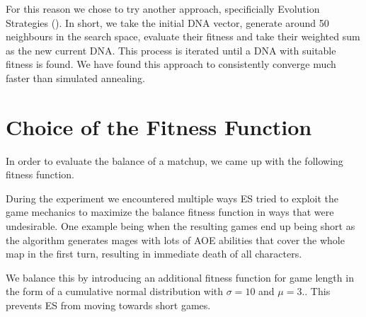 For this reason we chose to try another approach, specificially Evolution
Strategies (). In short, we take the initial DNA vector,
generate around 50 neighbours in the search space, evaluate their fitness
and take their weighted sum as the new current DNA. This process is iterated
until a DNA with suitable fitness is found. We have found this approach to
consistently converge much faster than simulated annealing.

\section{Choice of the Fitness Function}

In order to evaluate the balance of a matchup, we came up with the following fitness function.


During the experiment we encountered multiple ways ES tried to exploit the game
mechanics to maximize the balance fitness function in ways that were
undesirable. One example being when the resulting games end up being short as
the algorithm generates mages with lots of AOE abilities that cover the whole
map in the first turn, resulting in immediate death of all characters.

We balance this by introducing an additional fitness function for game length
in the form of a cumulative normal distribution with $\sigma = 10$ and $\mu =
3$..  This prevents ES from moving towards
short games.
